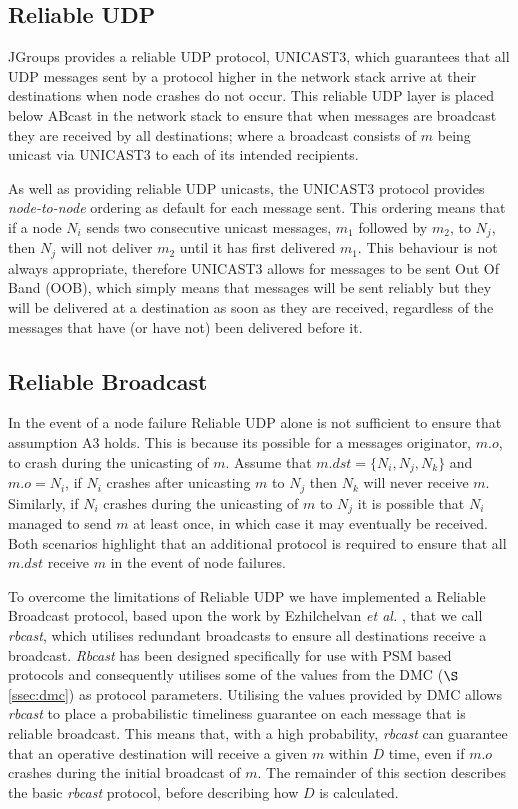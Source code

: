 	\subsection{Reliable UDP}\label{ssec:reliable_udp}
	JGroups provides a reliable UDP protocol, \textsf{UNICAST3}, which guarantees that all UDP messages sent by a protocol higher in the network stack arrive at their destinations when node crashes do not occur.  This reliable UDP layer is placed below \textsf{ABcast} in the network stack to ensure that when messages are broadcast they are received by all destinations; where a broadcast consists of $m$ being unicast via \textsf{UNICAST3} to each of its intended recipients.  
	
	As well as providing reliable UDP unicasts, the \textsf{UNICAST3} protocol provides \emph{node-to-node} ordering as default for each message sent.  This ordering means that if a node $N_i$ sends two consecutive unicast messages, $m_1$ followed by $m_2$, to $N_j$, then $N_j$ will not deliver $m_2$ until it has first delivered $m_1$.  This behaviour is not always appropriate, therefore \textsf{UNICAST3} allows for messages to be sent Out Of Band (OOB), which simply means that messages will be sent reliably but they will be delivered at a destination as soon as they are received, regardless of the messages that have (or have not) been delivered before it.  
	
	\subsection{Reliable Broadcast}\label{ssec:rbcast}
    In the event of a node failure Reliable UDP alone is not sufficient to ensure that assumption A3 holds.  This is because its possible for a messages originator, $m.o$, to crash during the unicasting of $m$.  Assume that $m.dst = \{N_i, N_j, N_k\}$ and $m.o = N_i$, if $N_i$ crashes after unicasting $m$ to $N_j$ then $N_k$ will never receive $m$.  Similarly, if $N_i$ crashes during the unicasting of $m$ to $N_j$ it is possible that $N_i$ managed to send $m$ at least once, in which case it may eventually be received.  Both scenarios highlight that an additional protocol is required to ensure that all $m.dst$ receive $m$ in the event of node failures.  
    
    To overcome the limitations of Reliable UDP we have implemented a Reliable Broadcast protocol, based upon the work by  Ezhilchelvan \emph{et al.} \citep{ezhilchelvan2011near}, that we call \emph{rbcast}, which utilises redundant broadcasts to ensure all destinations receive a broadcast.  \emph{Rbcast} has been designed specifically for use with PSM based protocols and consequently utilises some of the values from the DMC ($\S$ \ref{ssec:dmc}) as protocol parameters.  Utilising the values provided by DMC allows  \emph{rbcast} to place a probabilistic timeliness guarantee on each message that is reliable broadcast.  This means that, with a high probability, \emph{rbcast} can guarantee that an operative destination will receive a given $m$ within $D$ time, even if $m.o$ crashes during the initial broadcast of $m$.  The remainder of this section describes the basic \emph{rbcast} protocol, before describing how $D$ is calculated.
    
